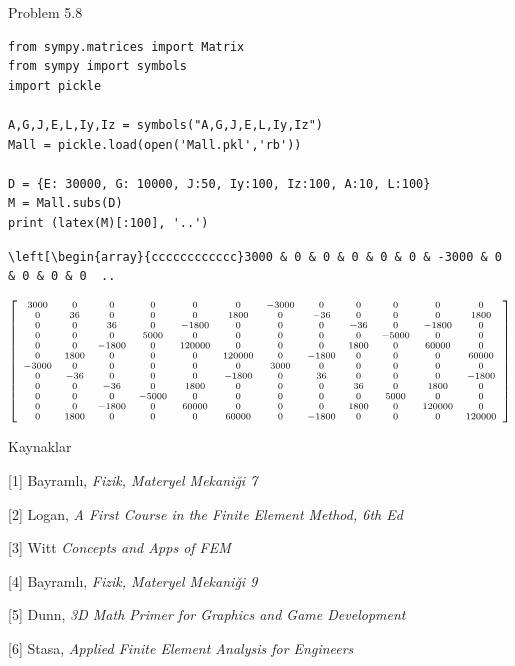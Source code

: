 \documentclass[12pt,fleqn]{article}\usepackage{../../common}
\begin{document}
Problem 5.8

\begin{verbatim}
from sympy.matrices import Matrix
from sympy import symbols
import pickle

A,G,J,E,L,Iy,Iz = symbols("A,G,J,E,L,Iy,Iz")
Mall = pickle.load(open('Mall.pkl','rb'))

D = {E: 30000, G: 10000, J:50, Iy:100, Iz:100, A:10, L:100}
M = Mall.subs(D)
print (latex(M)[:100], '..')
\end{verbatim}

\begin{verbatim}
\left[\begin{array}{cccccccccccc}3000 & 0 & 0 & 0 & 0 & 0 & -3000 & 0 & 0 & 0 & 0  ..
\end{verbatim}

$$
{\scriptsize
\left[\begin{array}{cccccccccccc}3000 & 0 & 0 & 0 & 0 & 0 & -3000 & 0 & 0 & 0 & 0 & 0\\0 & 36 & 0 & 0 & 0 & 1800 & 0 & -36 & 0 & 0 & 0 & 1800\\0 & 0 & 36 & 0 & -1800 & 0 & 0 & 0 & -36 & 0 & -1800 & 0\\0 & 0 & 0 & 5000 & 0 & 0 & 0 & 0 & 0 & -5000 & 0 & 0\\0 & 0 & -1800 & 0 & 120000 & 0 & 0 & 0 & 1800 & 0 & 60000 & 0\\0 & 1800 & 0 & 0 & 0 & 120000 & 0 & -1800 & 0 & 0 & 0 & 60000\\-3000 & 0 & 0 & 0 & 0 & 0 & 3000 & 0 & 0 & 0 & 0 & 0\\0 & -36 & 0 & 0 & 0 & -1800 & 0 & 36 & 0 & 0 & 0 & -1800\\0 & 0 & -36 & 0 & 1800 & 0 & 0 & 0 & 36 & 0 & 1800 & 0\\0 & 0 & 0 & -5000 & 0 & 0 & 0 & 0 & 0 & 5000 & 0 & 0\\0 & 0 & -1800 & 0 & 60000 & 0 & 0 & 0 & 1800 & 0 & 120000 & 0\\0 & 1800 & 0 & 0 & 0 & 60000 & 0 & -1800 & 0 & 0 & 0 & 120000\end{array}\right]
}
$$












Kaynaklar

[1] Bayramlı, {\em Fizik, Materyel Mekaniği 7}

[2] Logan, {\em A First Course in the Finite Element Method, 6th Ed}

[3] Witt {\em Concepts and Apps of FEM}

[4] Bayramlı, {\em Fizik, Materyel Mekaniği 9}

[5] Dunn, {\em 3D Math Primer for Graphics and Game Development}

[6] Stasa, {\em Applied Finite Element Analysis for Engineers}
\end{document}

